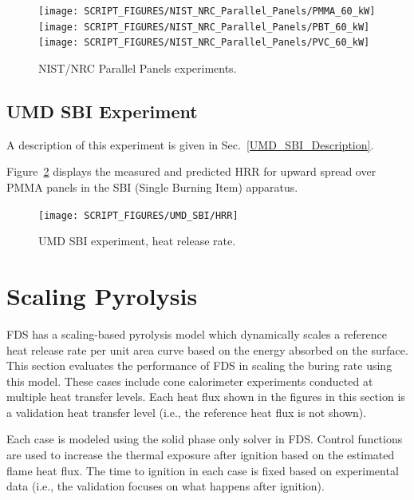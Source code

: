 \begin{figure}[!ht]
\centering
\texttt{[image: SCRIPT\_FIGURES/NIST\_NRC\_Parallel\_Panels/PMMA\_60\_kW]} \\
\texttt{[image: SCRIPT\_FIGURES/NIST\_NRC\_Parallel\_Panels/PBT\_60\_kW]} \\
\texttt{[image: SCRIPT\_FIGURES/NIST\_NRC\_Parallel\_Panels/PVC\_60\_kW]}
\caption[NIST/NRC Parallel Panels experiments]{NIST/NRC Parallel Panels experiments.}
\label{NIST_NRC_PP_HRR}
\end{figure}


\clearpage

\subsection{UMD SBI Experiment}

A description of this experiment is given in Sec.~\ref{UMD_SBI_Description}.

Figure~\ref{UMD_SBI_HRR} displays the measured and predicted HRR for upward spread over PMMA panels in the SBI (Single Burning Item) apparatus.

\begin{figure}[!ht]
\centering
\texttt{[image: SCRIPT\_FIGURES/UMD\_SBI/HRR]}
\caption[UMD SBI experiment, heat release rate]{UMD SBI experiment, heat release rate.}
\label{UMD_SBI_HRR}
\end{figure}

\clearpage

\section{Scaling Pyrolysis}\label{sec_Scaling Pyrolysis}

FDS has a scaling-based pyrolysis model which dynamically scales a reference heat release rate per unit area curve based on the energy absorbed on the surface.
This section evaluates the performance of FDS in scaling the buring rate using this model.
These cases include cone calorimeter experiments conducted at multiple heat transfer levels.
Each heat flux shown in the figures in this section is a validation heat transfer level (i.e., the reference heat flux is not shown).

Each case is modeled using the solid phase only solver in FDS.
Control functions are used to increase the thermal exposure after ignition based on the estimated flame heat flux.
The time to ignition in each case is fixed based on experimental data (i.e., the validation focuses on what happens after ignition).

